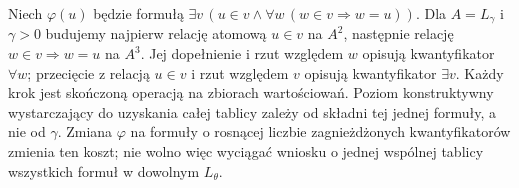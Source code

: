 \begin{przyklad}
\label{ex:l-local-satisfaction-76}
Niech $\varphi(u)$ będzie formułą
$\exists v\,(u\in v\land\forall w\,(w\in v\Rightarrow w=u))$.
Dla $A=L_\gamma$ i $\gamma>0$ budujemy najpierw
relację atomową $u\in v$ na $A^2$, następnie
relację $w\in v\Rightarrow w=u$ na $A^3$.
Jej dopełnienie i rzut względem $w$ opisują
kwantyfikator $\forall w$; przecięcie z relacją
$u\in v$ i rzut względem $v$ opisują
kwantyfikator $\exists v$. Każdy krok jest skończoną
operacją na zbiorach wartościowań. Poziom konstruktywny
wystarczający do uzyskania całej tablicy zależy
od składni tej jednej formuły, a nie od $\gamma$.
Zmiana $\varphi$ na formuły o rosnącej liczbie
zagnieżdżonych kwantyfikatorów zmienia ten koszt;
nie wolno więc wyciągać wniosku o jednej wspólnej
tablicy wszystkich formuł w dowolnym $L_\theta$.
\end{przyklad}


